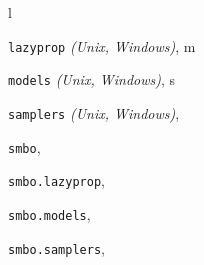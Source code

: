 \documentclass[letterpaper,10pt,english]{sphinxmanual}
\begin{document}
\renewcommand{\indexname}{Python Module Index}
\begin{theindex}
\def\bigletter#1{{\Large\sffamily#1}\nopagebreak\vspace{1mm}}
\bigletter{l}
\item {\texttt{lazyprop}} \emph{(Unix, Windows)}, \pageref{index:module-lazyprop}
\indexspace
\bigletter{m}
\item {\texttt{models}} \emph{(Unix, Windows)}, \pageref{index:module-models}
\indexspace
\bigletter{s}
\item {\texttt{samplers}} \emph{(Unix, Windows)}, \pageref{index:module-samplers}
\item {\texttt{smbo}}, \pageref{index:module-smbo}
\item {\texttt{smbo.lazyprop}}, \pageref{index:module-smbo.lazyprop}
\item {\texttt{smbo.models}}, \pageref{index:module-smbo.models}
\item {\texttt{smbo.samplers}}, \pageref{index:module-smbo.samplers}
\end{theindex}

\renewcommand{\indexname}{Index}
\printindex
\end{document}
